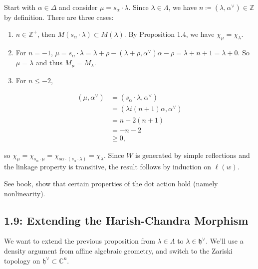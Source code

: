 \documentclass[11pt]{scrartcl}
\theoremstyle{definition}
\theoremstyle{theorem}
\theoremstyle{proof}
\newenvironment{proof}
{\pushQED{$\qed$}\pf}
{\par\popQED\endpf}
\theoremstyle{definition}
\theoremstyle{break}
\theoremstyle{problem}
\providecommand{\tightlist}{%
  \setlength{\itemsep}{0pt}\setlength{\parskip}{0pt}}
\newcommand{\CC}[0]{{\mathbb{C}}}
\newcommand{\ZZ}[0]{{\mathbb{Z}}}
\newcommand{\definedas}[0]{\coloneqq}
\newcommand{\dual}[0]{^\vee}
\newcommand{\lieh}[0]{{\mathfrak{h}}}
\renewcommand{\qed}[0]{\hfill\blacksquare}
\begin{document}
\begin{proof}

Start with \(\alpha \in \Delta\) and consider
\(\mu = s_\alpha \cdot \lambda\). Since \(\lambda \in \Lambda\), we have
\(n\definedas (\lambda ,\alpha\dual) \in \ZZ\) by definition. There are
three cases:

\begin{enumerate}
\def\labelenumi{\arabic{enumi}.}
\item
  \(n\in \ZZ^+\), then \(M(s_\alpha \cdot \lambda) \subset M(\lambda)\).
  By Proposition 1.4, we have \(\chi_\mu =\chi_\lambda\).
\item
  For \(n=-1\),
  \(\mu = s_\alpha \cdot \lambda = \lambda + \rho -(\lambda + \rho, \alpha\dual)\alpha - \rho = \lambda + n+1 = \lambda + 0\).
  So \(\mu = \lambda\) and thus \(M_\mu = M_\lambda\).
\item
  For \(n\leq -2\),
\end{enumerate}

\begin{align*}
(\mu, \alpha\dual) 
&= (s_\alpha \cdot \lambda , \alpha\dual) \\
&= (\lambda i (n+1)\alpha, \alpha\dual) \\
&= n - 2(n+1) \\
&= -n-2 \\
&\geq 0
,\end{align*}

so
\(\chi_\mu = \chi_{s_\alpha \cdot \mu} = \chi_{s\alpha \cdot (s_\alpha \cdot \lambda)} = \chi_\lambda\).
Since \(W\) is generated by simple reflections and the linkage property
is transitive, the result follows by induction on
\(\ell(w)\).\end{proof}

\begin{description}
\tightlist
\item[Exercise (1.8)]
See book, show that certain properties of the dot action hold (namely
nonlinearity).
\end{description}

\hypertarget{extending-the-harish-chandra-morphism}{%
\subsection{1.9: Extending the Harish-Chandra
Morphism}\label{extending-the-harish-chandra-morphism}}

We want to extend the previous proposition from \(\lambda \in \Lambda\)
to \(\lambda \in \lieh\dual\). We'll use a density argument from affine
algebraic geometry, and switch to the Zariski topology on
\(\lieh\dual \subset \CC^n\).
\end{document}
